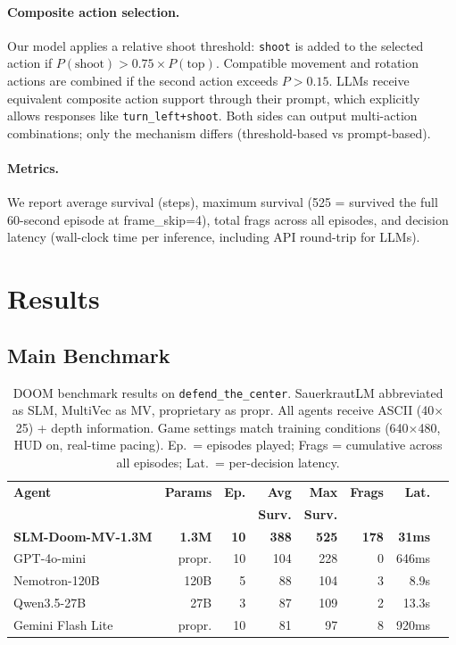 \documentclass[11pt,a4paper]{article}
\begin{document}
\paragraph{Composite action selection.} Our model applies a relative shoot threshold: \texttt{shoot} is added to the selected action if $P(\text{shoot}) > 0.75 \times P(\text{top})$. Compatible movement and rotation actions are combined if the second action exceeds $P > 0.15$. LLMs receive equivalent composite action support through their prompt, which explicitly allows responses like \texttt{turn\_left+shoot}. Both sides can output multi-action combinations; only the mechanism differs (threshold-based vs prompt-based).

\paragraph{Metrics.} We report average survival (steps), maximum survival (525 = survived the full 60-second episode at frame\_skip=4), total frags across all episodes, and decision latency (wall-clock time per inference, including API round-trip for LLMs).

\section{Results}
\label{sec:results}

\subsection{Main Benchmark}

\begin{table}[h]
\centering
\caption{DOOM benchmark results on \texttt{defend\_the\_center}. SauerkrautLM abbreviated as SLM, MultiVec as MV, proprietary as propr. All agents receive ASCII (40$\times$25) + depth information. Game settings match training conditions (640$\times$480, HUD on, real-time pacing). Ep.\ = episodes played; Frags = cumulative across all episodes; Lat.\ = per-decision latency.}
\label{tab:benchmark}
\begin{tabular}{lrrrrrrr}
\toprule
\textbf{Agent} & \textbf{Params} & \textbf{Ep.} & \textbf{Avg} & \textbf{Max} & \textbf{Frags} & \textbf{Lat.} \\
 & & & \textbf{Surv.} & \textbf{Surv.} & & \\
\midrule
\textbf{SLM-Doom-MV-1.3M} & \textbf{1.3M} & \textbf{10} & \textbf{388} & \textbf{525} & \textbf{178} & \textbf{31ms} \\
GPT-4o-mini & propr. & 10 & 104 & 228 & 0 & 646ms \\
Nemotron-120B & 120B & 5 & 88 & 104 & 3 & 8.9s \\
Qwen3.5-27B & 27B & 3 & 87 & 109 & 2 & 13.3s \\
Gemini Flash Lite & propr. & 10 & 81 & 97 & 8 & 920ms \\
\bottomrule
\end{tabular}
\end{table}
\end{document}
